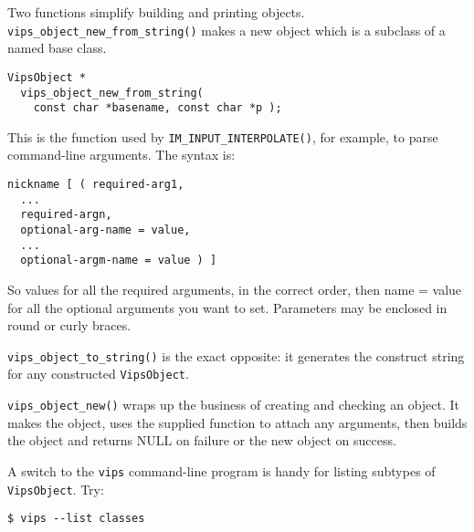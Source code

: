 Two functions simplify building and printing objects.
\verb+vips_object_new_from_string()+ makes a new object which is a subclass of
a named base class.

\begin{verbatim}
VipsObject *
  vips_object_new_from_string( 
    const char *basename, const char *p );
\end{verbatim}

This is the function used by \verb+IM_INPUT_INTERPOLATE()+, for example, to
parse command-line arguments. The syntax is:

\begin{verbatim}
nickname [ ( required-arg1, 
  ...
  required-argn,
  optional-arg-name = value,
  ...
  optional-argm-name = value ) ]
\end{verbatim}

So values for all the required arguments, in the correct order, then name =
value for all the optional arguments you want to set. Parameters may be
enclosed in round or curly braces.

\verb+vips_object_to_string()+ is the exact opposite: it generates the 
construct string for any constructed
\verb+VipsObject+.

\verb+vips_object_new()+ wraps up the business of creating and checking an
object. It makes the object, uses the supplied function to attach any
arguments, then builds the object and returns NULL on failure or the new
object on success.

A switch to the \verb+vips+ command-line program is handy for listing subtypes
of \verb+VipsObject+. Try:

\begin{verbatim}
$ vips --list classes
\end{verbatim}

